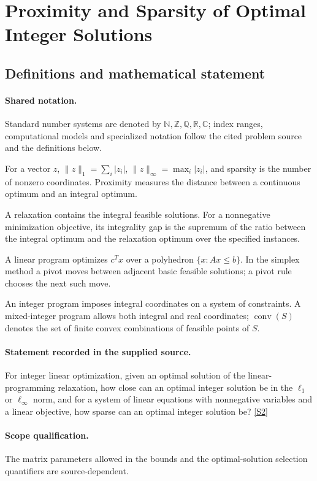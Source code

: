 \documentclass[11pt]{article}
\newcommand{\sref}[2]{\hyperlink{source:#1:#2}{[S#2]}}
\begin{document}
\section{Proximity and Sparsity of Optimal Integer Solutions}\label{statement}

\subsection{Definitions and mathematical statement}

\paragraph{Shared notation.}Standard number systems are denoted by $\mathbb N,\mathbb Z,\mathbb Q,\mathbb R,\mathbb C$; index ranges, computational models and specialized notation follow the cited problem source and the definitions below.


For a vector $z$, $\lVert z\rVert_1=\sum_i|z_i|$, $\lVert z\rVert_\infty=\max_i|z_i|$, and sparsity is the number of nonzero coordinates. Proximity measures the distance between a continuous optimum and an integral optimum.

A relaxation contains the integral feasible solutions. For a nonnegative minimization objective, its integrality gap is the supremum of the ratio between the integral optimum and the relaxation optimum over the specified instances.

A linear program optimizes $c^Tx$ over a polyhedron $\{x:Ax\leq b\}$. In the simplex method a pivot moves between adjacent basic feasible solutions; a pivot rule chooses the next such move.

An integer program imposes integral coordinates on a system of constraints. A mixed-integer program allows both integral and real coordinates; $\operatorname{conv}(S)$ denotes the set of finite convex combinations of feasible points of $S$.
\paragraph{Statement recorded in the supplied source.}
For integer linear optimization, given an optimal solution of the linear-programming relaxation, how close can an optimal integer solution be in the $\ell_1$ or $\ell_\infty$ norm, and for a system of linear equations with nonnegative variables and a linear objective, how sparse can an optimal integer solution be? \sref{statement}{2}
\paragraph{Scope qualification.}
The matrix parameters allowed in the bounds and the optimal-solution selection quantifiers are source-dependent.
\end{document}
